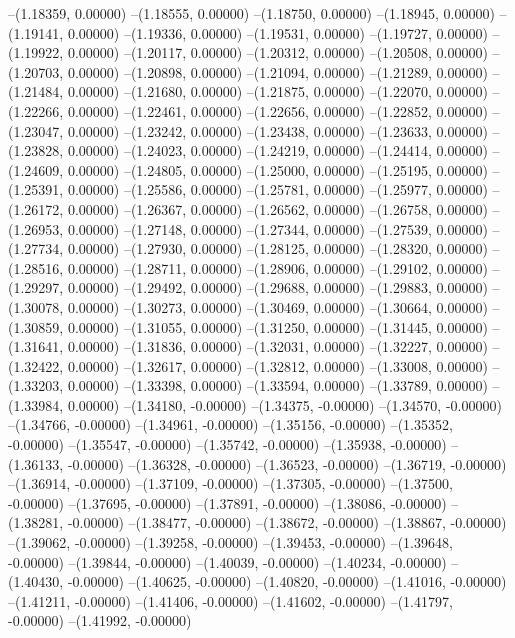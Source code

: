 --(1.18359, 0.00000)
--(1.18555, 0.00000)
--(1.18750, 0.00000)
--(1.18945, 0.00000)
--(1.19141, 0.00000)
--(1.19336, 0.00000)
--(1.19531, 0.00000)
--(1.19727, 0.00000)
--(1.19922, 0.00000)
--(1.20117, 0.00000)
--(1.20312, 0.00000)
--(1.20508, 0.00000)
--(1.20703, 0.00000)
--(1.20898, 0.00000)
--(1.21094, 0.00000)
--(1.21289, 0.00000)
--(1.21484, 0.00000)
--(1.21680, 0.00000)
--(1.21875, 0.00000)
--(1.22070, 0.00000)
--(1.22266, 0.00000)
--(1.22461, 0.00000)
--(1.22656, 0.00000)
--(1.22852, 0.00000)
--(1.23047, 0.00000)
--(1.23242, 0.00000)
--(1.23438, 0.00000)
--(1.23633, 0.00000)
--(1.23828, 0.00000)
--(1.24023, 0.00000)
--(1.24219, 0.00000)
--(1.24414, 0.00000)
--(1.24609, 0.00000)
--(1.24805, 0.00000)
--(1.25000, 0.00000)
--(1.25195, 0.00000)
--(1.25391, 0.00000)
--(1.25586, 0.00000)
--(1.25781, 0.00000)
--(1.25977, 0.00000)
--(1.26172, 0.00000)
--(1.26367, 0.00000)
--(1.26562, 0.00000)
--(1.26758, 0.00000)
--(1.26953, 0.00000)
--(1.27148, 0.00000)
--(1.27344, 0.00000)
--(1.27539, 0.00000)
--(1.27734, 0.00000)
--(1.27930, 0.00000)
--(1.28125, 0.00000)
--(1.28320, 0.00000)
--(1.28516, 0.00000)
--(1.28711, 0.00000)
--(1.28906, 0.00000)
--(1.29102, 0.00000)
--(1.29297, 0.00000)
--(1.29492, 0.00000)
--(1.29688, 0.00000)
--(1.29883, 0.00000)
--(1.30078, 0.00000)
--(1.30273, 0.00000)
--(1.30469, 0.00000)
--(1.30664, 0.00000)
--(1.30859, 0.00000)
--(1.31055, 0.00000)
--(1.31250, 0.00000)
--(1.31445, 0.00000)
--(1.31641, 0.00000)
--(1.31836, 0.00000)
--(1.32031, 0.00000)
--(1.32227, 0.00000)
--(1.32422, 0.00000)
--(1.32617, 0.00000)
--(1.32812, 0.00000)
--(1.33008, 0.00000)
--(1.33203, 0.00000)
--(1.33398, 0.00000)
--(1.33594, 0.00000)
--(1.33789, 0.00000)
--(1.33984, 0.00000)
--(1.34180, -0.00000)
--(1.34375, -0.00000)
--(1.34570, -0.00000)
--(1.34766, -0.00000)
--(1.34961, -0.00000)
--(1.35156, -0.00000)
--(1.35352, -0.00000)
--(1.35547, -0.00000)
--(1.35742, -0.00000)
--(1.35938, -0.00000)
--(1.36133, -0.00000)
--(1.36328, -0.00000)
--(1.36523, -0.00000)
--(1.36719, -0.00000)
--(1.36914, -0.00000)
--(1.37109, -0.00000)
--(1.37305, -0.00000)
--(1.37500, -0.00000)
--(1.37695, -0.00000)
--(1.37891, -0.00000)
--(1.38086, -0.00000)
--(1.38281, -0.00000)
--(1.38477, -0.00000)
--(1.38672, -0.00000)
--(1.38867, -0.00000)
--(1.39062, -0.00000)
--(1.39258, -0.00000)
--(1.39453, -0.00000)
--(1.39648, -0.00000)
--(1.39844, -0.00000)
--(1.40039, -0.00000)
--(1.40234, -0.00000)
--(1.40430, -0.00000)
--(1.40625, -0.00000)
--(1.40820, -0.00000)
--(1.41016, -0.00000)
--(1.41211, -0.00000)
--(1.41406, -0.00000)
--(1.41602, -0.00000)
--(1.41797, -0.00000)
--(1.41992, -0.00000)
